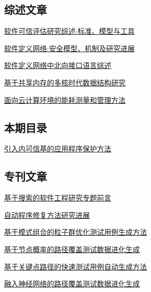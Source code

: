 \documentclass[a4paper]{article}
\begin{document}
\subsection{综述文章}
\href{http://www.jos.org.cn/ch/reader/download_pdf.aspx?file_no=5024&year_id=2016&quarter_id=4&falg=1}{软件可信评估研究综述:标准、模型与工具}

\href{http://www.jos.org.cn/ch/reader/download_pdf.aspx?file_no=5020&year_id=2016&quarter_id=4&falg=1}{软件定义网络:安全模型、机制及研究进展}

\href{http://www.jos.org.cn/ch/reader/download_pdf.aspx?file_no=5028&year_id=2016&quarter_id=4&falg=1}{软件定义网络中北向接口语言综述}

\href{http://www.jos.org.cn/ch/reader/download_pdf.aspx?file_no=5021&year_id=2016&quarter_id=4&falg=1}{基于共享内存的多核时代数据结构研究}

\href{http://www.jos.org.cn/ch/reader/download_pdf.aspx?file_no=5022&year_id=2016&quarter_id=4&falg=1}{面向云计算环境的能耗测量和管理方法}

\subsection{本期目录}
\href{http://www.jos.org.cn/ch/reader/download_pdf.aspx?file_no=5016&year_id=2016&quarter_id=4&falg=1}{引入内可信基的应用程序保护方法}

\subsection{专刊文章}
\href{http://www.jos.org.cn/ch/reader/download_pdf.aspx?file_no=4976&year_id=2016&quarter_id=4&falg=1}{基于搜索的软件工程研究专题前言}

\href{http://www.jos.org.cn/ch/reader/download_pdf.aspx?file_no=4972&year_id=2016&quarter_id=4&falg=1}{自动程序修复方法研究进展}

\href{http://www.jos.org.cn/ch/reader/download_pdf.aspx?file_no=4966&year_id=2016&quarter_id=4&falg=1}{基于模式组合的粒子群优化测试用例生成方法}

\href{http://www.jos.org.cn/ch/reader/download_pdf.aspx?file_no=4967&year_id=2016&quarter_id=4&falg=1}{基于节点概率的路径覆盖测试数据进化生成}

\href{http://www.jos.org.cn/ch/reader/download_pdf.aspx?file_no=4971&year_id=2016&quarter_id=4&falg=1}{基于关键点路径的快速测试用例自动生成方法}

\href{http://www.jos.org.cn/ch/reader/download_pdf.aspx?file_no=4973&year_id=2016&quarter_id=4&falg=1}{融入神经网络的路径覆盖测试数据进化生成}
\end{document}
